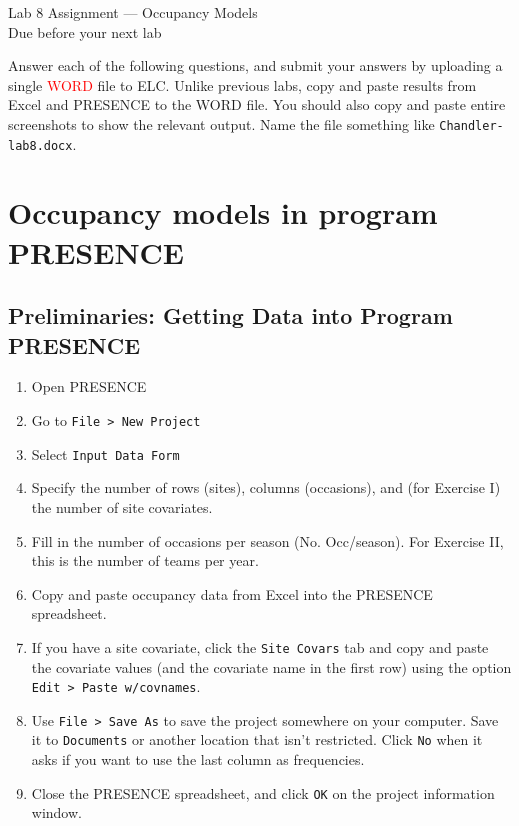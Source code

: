 \documentclass[12pt]{article}\usepackage[]{graphicx}\usepackage[]{color}
\begin{document}
{
  \Large
  \centering
  Lab 8 Assignment --- Occupancy Models \\
  Due before your next lab \par
}

\vspace{10pt}


Answer each of the following questions, and submit your answers by
uploading a single \textcolor{red}{WORD} file to ELC. Unlike previous labs,
copy and paste results from Excel and PRESENCE to the WORD file. You should also copy and paste entire screenshots to show the relevant output. Name
the file something like \texttt{Chandler-lab8.docx}.  




\section*{Occupancy models in program PRESENCE}

\subsection*{\normalsize Preliminaries: Getting Data into Program PRESENCE}
\vspace{-10pt}
\begin{enumerate}
  \itemsep-6pt
  \item[(1)]  Open PRESENCE
  \item[(2)]  Go to \texttt{File > New Project}
  \item[(3)]  Select \texttt{Input Data Form}
  \item[(4)]  Specify the number of rows (sites), columns
    (occasions), and (for Exercise I) the number of site covariates. 
  \item[(5)]  Fill in the number of occasions per season
    (No. Occ/season). For Exercise II, this is the number of teams per
    year. 
  \item[(6)]  Copy and paste occupancy data from Excel into the
    PRESENCE spreadsheet. 
  \item[(7)]  If you have a site covariate, click the \texttt{Site
      Covars} tab and copy and paste the covariate values (and the
    covariate name in the first row) using the option \texttt{Edit > Paste
    w/covnames}.  
  \item[(8)]  Use \texttt{File > Save As} to save the project
    somewhere on your computer. Save it to \texttt{Documents} or
    another location that isn't restricted. Click \texttt{No} when it
    asks if you want to use the last column as frequencies. 
  \item[(9)]  Close the PRESENCE spreadsheet, and click \texttt{OK} on
    the project information window.  
\end{enumerate}
\end{document}
